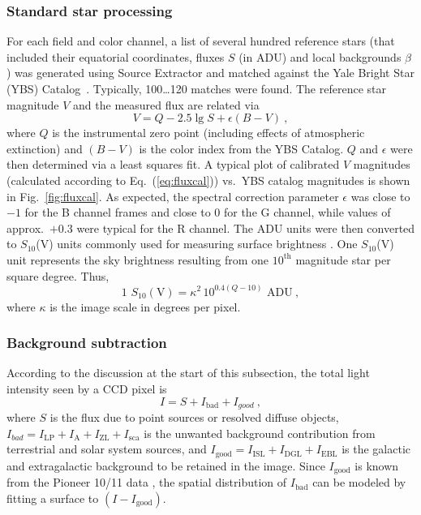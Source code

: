 \documentclass[preprint]{aastex}
\begin{document}
\subsubsection{Standard star processing}
For each field and color channel, a list of several hundred reference stars (that included their equatorial coordinates, fluxes $S$ (in ADU) and local backgrounds $\beta$) was generated using Source Extractor and matched against the Yale Bright Star (YBS) Catalog~\citep{Hof1995}. Typically, 100\dots 120 matches were found. The reference star magnitude $V$ and the measured flux are related via
\begin{equation}
V = Q - 2.5\lg S + \epsilon(B-V)\:,
\label{eq:fluxcal}
\end{equation}
where $Q$ is the instrumental zero point (including effects of atmospheric extinction) and $(B-V)$ is the color index from the YBS Catalog. $Q$ and $\epsilon$ were then determined via a least squares fit. A typical plot of calibrated $V$ magnitudes (calculated according to Eq.~(\ref{eq:fluxcal})) vs.\ YBS catalog magnitudes is shown in Fig.~\ref{fig:fluxcal}.
As expected, the spectral correction parameter $\epsilon$ was close to $-1$ for the B channel frames and close to $0$ for the G channel, while values of approx.\ $+0.3$ were typical for the R channel. The ADU units were then converted to $S_{10}$(V) units commonly used for measuring surface brightness \citep{Spa1976}. One $S_{10}$(V) unit represents the sky brightness resulting from one $10^\text{th}$ magnitude star per square degree. Thus, 
\begin{equation}
1\text{~}S_{10}(\text{V}) = \kappa^2\, 10^{0.4(Q-10)}\text{~ADU}\:,
\end{equation}
where $\kappa$ is the image scale in degrees per pixel.


\subsubsection{Background subtraction}\label{sec:bgsubt}
According to the discussion at the start of this subsection, the total light intensity seen by a CCD pixel is 
\begin{equation}
I = S + I_\text{bad} + I_{good}\:,
\end{equation}
where $S$ is the flux due to point sources or resolved diffuse objects, $I_{bad} = I_\text{LP} + I_\text{A} + I_\text{ZL} + I_\text{sca}$ is the unwanted background contribution from terrestrial and solar system sources, and $I_\text{good} = I_\text{ISL} + I_\text{DGL} + I_\text{EBL}$ is the galactic and extragalactic background to be retained in the image. Since $I_\text{good}$ is known from the Pioneer 10/11 data \citep{Gor1998}, the spatial distribution of $I_\text{bad}$ can be modeled by fitting a surface to $(I-I_\text{good})$.
\end{document}
